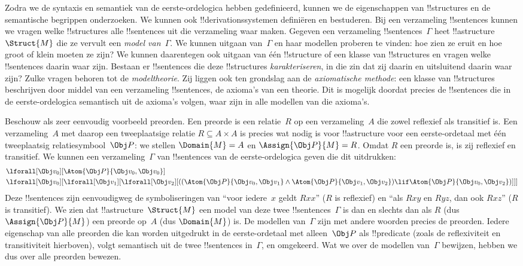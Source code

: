 \documentclass[openany]{memoir}
\begin{document}


Zodra we de syntaxis en semantiek van de eerste-ordelogica hebben
gedefinieerd, kunnen we de eigenschappen van !!{structure}s en de
semantische begrippen onderzoeken. We kunnen ook
!!{derivation}ssystemen definiëren en bestuderen. Bij een verzameling
!!{sentence}s kunnen we vragen welke !!{structure}s alle !!{sentence}s
uit die verzameling waar maken. Gegeven een verzameling
!!{sentence}s~$\Gamma$ heet !!a{structure}~$\Struct{M}$ die ze vervult
een \emph{model van~$\Gamma$}. We kunnen uitgaan van~$\Gamma$ en haar
modellen proberen te vinden: hoe zien ze eruit en hoe groot of klein
moeten ze zijn? We kunnen daarentegen ook uitgaan van één !!{structure}
of een klasse van !!{structure}s en vragen welke !!{sentence}s daarin
waar zijn. Bestaan er !!{sentence}s die deze !!{structure}s
\emph{karakteriseren}, in die zin dat zij daarin en uitsluitend daarin
waar zijn? Zulke vragen behoren tot de \emph{modeltheorie}. Zij liggen
ook ten grondslag aan de \emph{axiomatische methode}: een klasse van
!!{structure}s beschrijven door middel van een verzameling
!!{sentence}s, de axioma's van een theorie. Dit is mogelijk doordat
precies de !!{sentence}s die in de eerste-ordelogica semantisch uit de
axioma's volgen, waar zijn in alle modellen van die axioma's.

Beschouw als zeer eenvoudig voorbeeld preorden. Een preorde is een
relatie~$R$ op een verzameling~$A$ die zowel reflexief als transitief
is. Een verzameling~$A$ met daarop een tweeplaatsige relatie
$R \subseteq A \times A$ is precies wat nodig is voor !!a{structure}
voor een eerste-ordetaal met één tweeplaatsig relatiesymbool~$\Obj P$:
we stellen $\Domain{M} = A$ en $\Assign{\Obj P}{M} = R$. Omdat $R$ een
preorde is, is zij reflexief en transitief. We kunnen een
verzameling~$\Gamma$ van !!{sentence}s van de eerste-ordelogica geven
die dit uitdrukken:
\begin{align*}
  & \lforall[\Obj v_0][\Atom{\Obj P}{\Obj v_0,\Obj v_0}]\\
  & \lforall[\Obj v_0][\lforall[\Obj v_1][\lforall[\Obj v_2][((\Atom{\Obj P}{\Obj v_0,\Obj v_1} \land \Atom{\Obj P}{\Obj v_1,\Obj v_2}) \lif \Atom{\Obj P}{\Obj v_0,\Obj v_2})]]]
\end{align*}
Deze !!{sentence}s zijn eenvoudigweg de symboliseringen van ``voor
iedere~$x$ geldt $Rxx$'' ($R$ is reflexief) en ``als $Rxy$ en $Ryz$,
dan ook $Rxz$'' ($R$ is transitief). We zien dat
!!a{structure}~$\Struct{M}$ een model van deze twee
!!{sentence}s~$\Gamma$ is dan en slechts dan als $R$ (dus
$\Assign{\Obj P}{M}$) een preorde op~$A$ (dus $\Domain{M}$) is. De
modellen van~$\Gamma$ zijn met andere woorden precies de preorden.
Iedere eigenschap van alle preorden die kan worden uitgedrukt in de
eerste-ordetaal met alleen~$\Obj P$ als !!{predicate} (zoals de
reflexiviteit en transitiviteit hierboven), volgt semantisch uit de
twee !!{sentence}s in~$\Gamma$, en omgekeerd. Wat we over de modellen
van~$\Gamma$ bewijzen, hebben we dus over alle preorden bewezen.
\end{document}
